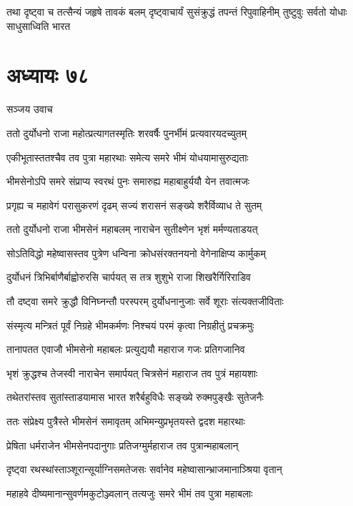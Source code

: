 \threelineshloka
{तथा दृष्ट्वा च तत्सैन्यं जहृषे तावकं बलम्}
{दृष्ट्वाचार्यं सुसंक्रुद्धं तपन्तं रिपुवाहिनीम्}
{तुष्टुवुः सर्वतो योधाः साधुसाध्विति भारत}


\chapter{अध्यायः ७८}
\twolineshloka
{सञ्जय उवाच}
{}


\twolineshloka
{ततो दुर्योधनो राजा महोत्प्रत्यागतस्मृतिः}
{शरवर्षैः पुनर्भीमं प्रत्यवारयदच्युतम्}


\twolineshloka
{एकीभूतास्ततश्चैव तव पुत्रा महारथाः}
{समेत्य समरे भीमं योधयामासुरुद्यताः}


\twolineshloka
{भीमसेनोऽपि समरे संप्राप्य स्वरथं पुनः}
{समारुह्य महाबाहुर्ययौ येन तवात्मजः}


\twolineshloka
{प्रगृह्य च महावेगं परासुकरणं दृढम्}
{सज्यं शरासनं सङ्ख्ये शरैर्विव्याध ते सुतम्}


\twolineshloka
{ततो दुर्योधनो राजा भीमसेनं महाबलम्}
{नाराचेन सुतीक्ष्णेन भृशं मर्मण्यताडयत्}


\twolineshloka
{सोऽतिविद्धो महेष्वासस्तव पुत्रेण धन्विना}
{क्रोधसंरक्तनयनो वेगेनाक्षिप्य कार्मुकम्}


\twolineshloka
{दुर्योधनं त्रिभिर्बाणैर्बाह्वोरुरसि चार्पयत्}
{स तत्र शुशुभे राजा शिखरैर्गिरिराडिव}


\twolineshloka
{तौ दष्ट्वा समरे क्रुद्धौ विनिघ्नन्तौ परस्परम्}
{दुर्योधनानुजाः सर्वे शूराः संत्यक्तजीविताः}


\twolineshloka
{संस्मृत्य मन्त्रितं पूर्वं निग्रहे भीमकर्मणः}
{निश्चयं परमं कृत्वा निग्रहीतुं प्रचक्रमुः}


\twolineshloka
{तानापतत एवाजौ भीमसेनो महाबलः}
{प्रत्युद्ययौ महाराज गजः प्रतिगजानिव}


\twolineshloka
{भृशं क्रुद्धश्च तेजस्वी नाराचेन समार्पयत्}
{चित्रसेनं महाराज तव पुत्रं महायशाः}


\twolineshloka
{तथेतरांस्तव सुतांस्ताडयामास भारत}
{शरैर्बहुविधैः सङ्ख्ये रुक्मपुङ्खैः सुतेजनैः}


\twolineshloka
{ततः संप्रेक्ष्य पुत्रैस्ते भीमसेनं समावृतम्}
{अभिमन्युप्रभृतयस्ते द्वदश महारथाः}


\twolineshloka
{प्रेषिता धर्मराजेन भीमसेनपदानुगाः}
{प्रतिजग्मुर्महाराज तव पुत्रान्महाबलान्}


\twolineshloka
{दृष्ट्वा रथस्थांस्ताञ्शूरान्सूर्याग्निसमतेजसः}
{सर्वानेव महेष्वासान्भ्राजमानाञ्श्रिया वृतान्}


\twolineshloka
{महाहवे दीष्यमानान्सुवर्णमकुटोञ्ज्वलान्}
{तत्यजुः समरे भीमं तव पुत्रा महाबलाः}


